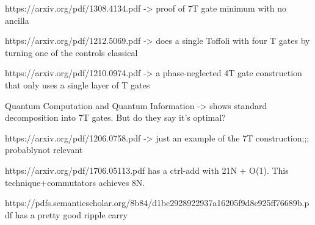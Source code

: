 \documentclass[twocolumn,longbibliography]{quantumarticle-customized}
\begin{document}
https://arxiv.org/pdf/1308.4134.pdf -> proof of 7T gate minimum with no ancilla

https://arxiv.org/pdf/1212.5069.pdf  ->   does a single Toffoli with four T gates by turning one of the controls classical

https://arxiv.org/pdf/1210.0974.pdf  ->   a phase-neglected 4T gate construction that only uses a single layer of T gates


Quantum Computation and Quantum Information -> shows standard decomposition into 7T gates. But do they say it's optimal?

https://arxiv.org/pdf/1206.0758.pdf -> just an example of the 7T construction;;; probablynot relevant



https://arxiv.org/pdf/1706.05113.pdf   has a ctrl-add with 21N + O(1). This technique+commutators achieves 8N.


https://pdfs.semanticscholar.org/8b84/d1bc2928922937a16205f9d8c925ff76689b.pdf     has a pretty good ripple carry
\end{document}
